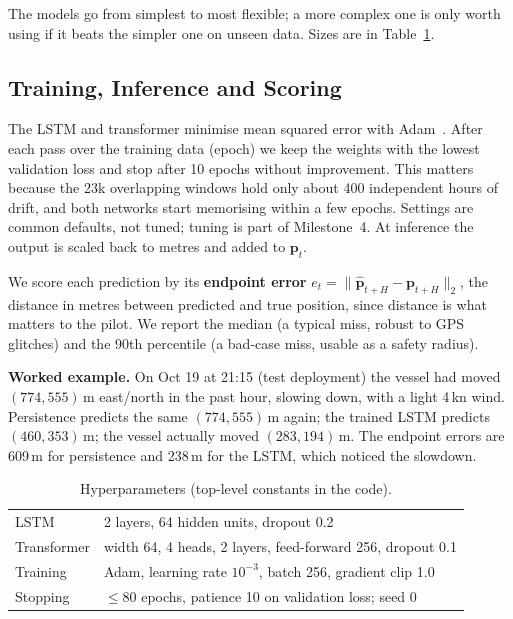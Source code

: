 \documentclass[sigconf]{acmart}
\begin{document}
The models go from simplest to most flexible; a more complex one is only worth using if it beats the simpler one on unseen data. Sizes are in Table~\ref{tab:hparams}.

\subsection{Training, Inference and Scoring}
The LSTM and transformer minimise mean squared error with Adam~\cite{kingma2015adam}. After each pass over the training data (epoch) we keep the weights with the lowest validation loss and stop after 10 epochs without improvement. This matters because the 23k overlapping windows hold only about 400 independent hours of drift, and both networks start memorising within a few epochs. Settings are common defaults, not tuned; tuning is part of Milestone~4. At inference the output is scaled back to metres and added to $\mathbf{p}_t$.

We score each prediction by its \textbf{endpoint error} $e_t=\|\hat{\mathbf{p}}_{t+H}-\mathbf{p}_{t+H}\|_2$, the distance in metres between predicted and true position, since distance is what matters to the pilot. We report the median (a typical miss, robust to GPS glitches) and the 90th percentile (a bad-case miss, usable as a safety radius).

\textbf{Worked example.} On Oct 19 at 21:15 (test deployment) the vessel had moved $(774, 555)$\,m east/north in the past hour, slowing down, with a light 4\,kn wind. Persistence predicts the same $(774, 555)$\,m again; the trained LSTM predicts $(460, 353)$\,m; the vessel actually moved $(283, 194)$\,m. The endpoint errors are 609\,m for persistence and 238\,m for the LSTM, which noticed the slowdown.

\begin{table}[t]
\caption{Hyperparameters (top-level constants in the code).}
\label{tab:hparams}
\footnotesize
\begin{tabular}{@{}ll@{}}
\toprule
LSTM & 2 layers, 64 hidden units, dropout 0.2 \\
Transformer & width 64, 4 heads, 2 layers, feed-forward 256, dropout 0.1 \\
Training & Adam, learning rate $10^{-3}$, batch 256, gradient clip 1.0 \\
Stopping & $\leq$80 epochs, patience 10 on validation loss; seed 0 \\
\bottomrule
\end{tabular}
\end{table}
\end{document}
